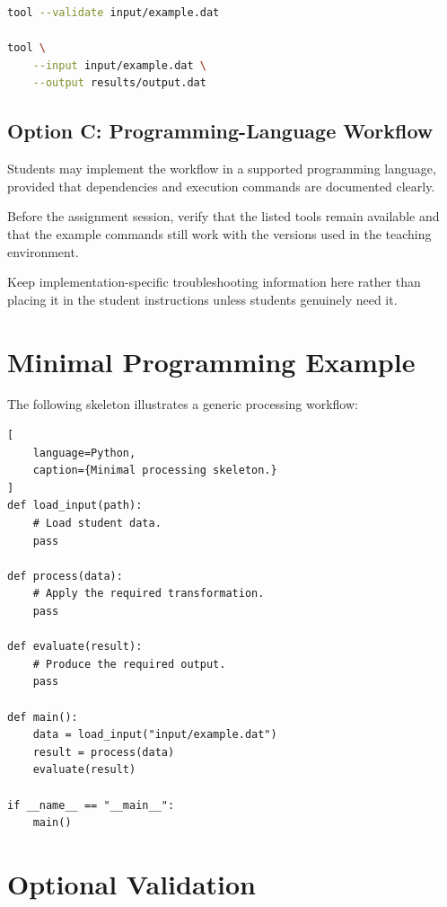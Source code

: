\documentclass[11pt]{article}
\begin{document}
\begin{lstlisting}[language=bash]
tool --validate input/example.dat

tool \
    --input input/example.dat \
    --output results/output.dat
\end{lstlisting}

\subsection{Option C: Programming-Language Workflow}

Students may implement the workflow in a supported programming language,
provided that dependencies and execution commands are documented clearly.

\begin{tutornote}
Before the assignment session, verify that the listed tools remain available
and that the example commands still work with the versions used in the
teaching environment.

Keep implementation-specific troubleshooting information here rather than
placing it in the student instructions unless students genuinely need it.
\end{tutornote}

\section{Minimal Programming Example}

The following skeleton illustrates a generic processing workflow:

\begin{lstlisting}[
    language=Python,
    caption={Minimal processing skeleton.}
]
def load_input(path):
    # Load student data.
    pass

def process(data):
    # Apply the required transformation.
    pass

def evaluate(result):
    # Produce the required output.
    pass

def main():
    data = load_input("input/example.dat")
    result = process(data)
    evaluate(result)

if __name__ == "__main__":
    main()
\end{lstlisting}

\section{Optional Validation}
\end{document}
